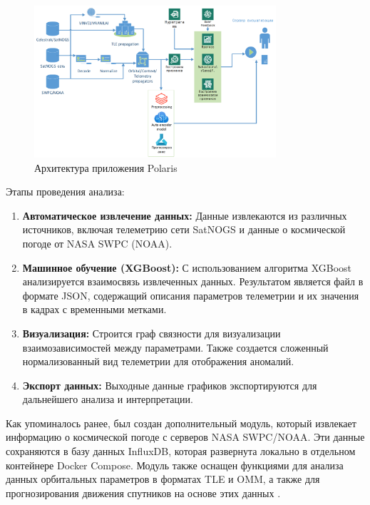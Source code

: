 \documentclass[12pt, a4paper]{extreport}
\begin{document}
\begin{figure}[htbp]
    \centering
    \includegraphics[width=0.8\textwidth]{polaris_architecture.png}
    \caption{Архитектура приложения Polaris}
    \label{fig:polaris_architecture}
\end{figure}

Этапы проведения анализа: 

\begin{enumerate}[label=\arabic*.]
\item \textbf{Автоматическое извлечение данных:} 
    Данные извлекаются из различных источников, включая телеметрию сети SatNOGS и данные о космической погоде от NASA SWPC (NOAA).

\item \textbf{Машинное обучение (XGBoost):}
    С использованием алгоритма XGBoost \cite{xgboost}\cite{boumghar2018enhanced} анализируется взаимосвязь извлеченных данных. Результатом является файл в формате JSON, содержащий описания параметров телеметрии и их значения в кадрах с временными метками.

\item \textbf{Визуализация:} 
    Строится граф связности для визуализации взаимозависимостей между параметрами. Также создается сложенный нормализованный вид телеметрии для отображения аномалий.

\item \textbf{Экспорт данных:} 
    Выходные данные графиков экспортируются для дальнейшего анализа и интерпретации.
\end{enumerate}

Как упоминалось ранее, был создан дополнительный модуль, который извлекает информацию о космической погоде с серверов NASA SWPC/NOAA. Эти данные сохраняются в базу данных InfluxDB, которая развернута локально в отдельном контейнере Docker Compose. Модуль также оснащен функциями для анализа данных орбитальных параметров в форматах TLE и OMM, а также для прогнозирования движения спутников на основе этих данных \cite{bottou1991stochastic}\cite{killick2012optimal}.
\end{document}

